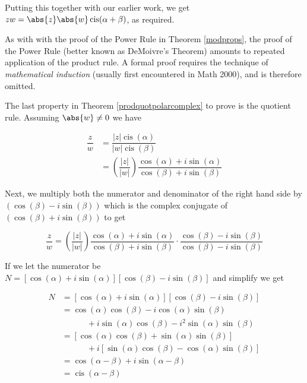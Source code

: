Putting this together with our earlier work, we get $zw = \abs{z} \abs{w} \operatorname{cis}(\alpha + \beta)$, as required.  

\smallskip

As with with the proof of the Power Rule in Theorem \ref{modprops}, the proof of the Power Rule (better known  as DeMoivre's Theorem) amounts to repeated application of the product rule. A formal proof requires the technique of \textit{mathematical induction} (usually first encountered in Math 2000), and is therefore omitted. 
\smallskip

The last property in Theorem \ref{prodquotpolarcomplex} to prove is the quotient rule.   Assuming $\abs{w} \neq 0$ we have

\begin{align*}
\dfrac{z}{w} & =  \dfrac{|z| \operatorname{cis}(\alpha)}{|w| \operatorname{cis}(\beta)}  \\[3pt]
			 & =  \left( \dfrac{|z|}{|w|}\right) \dfrac{\cos(\alpha) + i \sin(\alpha)}{\cos(\beta) + i \sin(\beta)}
\end{align*}
						 
Next, we multiply both the numerator and denominator of the right hand side by $(\cos(\beta) - i \sin(\beta))$ which is the complex conjugate of $(\cos(\beta) + i \sin(\beta))$ to get

\[
\dfrac{z}{w}	 =  \left( \dfrac{|z|}{|w|}\right) \dfrac{\cos(\alpha) + i \sin(\alpha)}{\cos(\beta) + i \sin(\beta)} \cdot \dfrac{\cos(\beta) - i \sin(\beta)}{\cos(\beta) - i \sin(\beta)} 
\]

If we let the numerator be $N = \left[\cos(\alpha) + i \sin(\alpha)\right] \left[\cos(\beta) - i \sin(\beta)\right]$ and simplify we get

\begin{align*}
N & = \left[\cos(\alpha) + i \sin(\alpha)\right] \left[\cos(\beta) - i \sin(\beta)\right]  \\ 
  & =  \cos(\alpha)\cos(\beta)-i\cos(\alpha)\sin(\beta)\\
  &\quad\quad\quad  + i \sin(\alpha)\cos(\beta) - i^2 \sin(\alpha)\sin(\beta)  \tag*{Expand} \\
	& =  \left[\cos(\alpha)\cos(\beta)+\sin(\alpha)\sin(\beta)\right]\\
	&\quad\quad\quad + i\left[\sin(\alpha)\cos(\beta) -\cos(\alpha)\sin(\beta)  \right]  \tag*{Rearrange and Factor} \\
	& = \cos(\alpha - \beta) + i \sin(\alpha - \beta)   \tag*{Difference Identities}  \\
	& =  \operatorname{cis}(\alpha - \beta) \tag*{Definition of `cis'} 
\end{align*}
	
